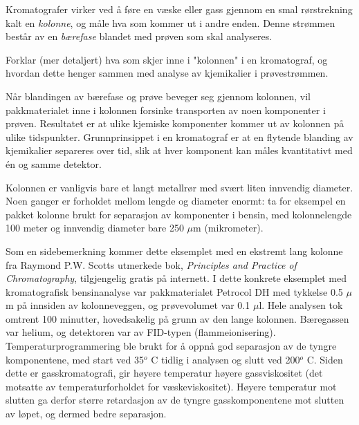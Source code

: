 

Kromatografer virker ved å føre en væske eller gass gjennom en smal rørstrekning kalt en {\it kolonne}, og måle hva som kommer ut i andre enden. Denne strømmen består av en {\it bærefase} blandet med prøven som skal analyseres.

Forklar (mer detaljert) hva som skjer inne i "kolonnen" i en kromatograf, og hvordan dette henger sammen med analyse av kjemikalier i prøvestrømmen.







Når blandingen av bærefase og prøve beveger seg gjennom kolonnen, vil pakkmaterialet inne i kolonnen forsinke transporten av noen komponenter i prøven. Resultatet er at ulike kjemiske komponenter kommer ut av kolonnen på ulike tidspunkter. Grunnprinsippet i en kromatograf er at en flytende blanding av kjemikalier separeres over tid, slik at hver komponent kan måles kvantitativt med én og samme detektor.

\vskip 10pt

Kolonnen er vanligvis bare et langt metallrør med svært liten innvendig diameter. Noen ganger er forholdet mellom lengde og diameter enormt: ta for eksempel en pakket kolonne brukt for separasjon av komponenter i bensin, med kolonnelengde 100 meter og innvendig diameter bare 250 $\mu$m (mikrometer).

Som en sidebemerkning kommer dette eksemplet med en ekstremt lang kolonne fra Raymond P.W. Scotts utmerkede bok, {\it Principles and Practice of Chromatography}, tilgjengelig gratis på internett. I dette konkrete eksemplet med kromatografisk bensinanalyse var pakkmaterialet Petrocol DH med tykkelse 0.5 $\mu$m på innsiden av kolonneveggen, og prøvevolumet var 0.1 $\mu$l. Hele analysen tok omtrent 100 minutter, hovedsakelig på grunn av den lange kolonnen. Bæregassen var helium, og detektoren var av FID-typen (flammeionisering). Temperaturprogrammering ble brukt for å oppnå god separasjon av de tyngre komponentene, med start ved 35$^{o}$ C tidlig i analysen og slutt ved 200$^{o}$ C. Siden dette er gasskromatografi, gir høyere temperatur høyere gassviskositet (det motsatte av temperaturforholdet for væskeviskositet). Høyere temperatur mot slutten ga derfor større retardasjon av de tyngre gasskomponentene mot slutten av løpet, og dermed bedre separasjon.









